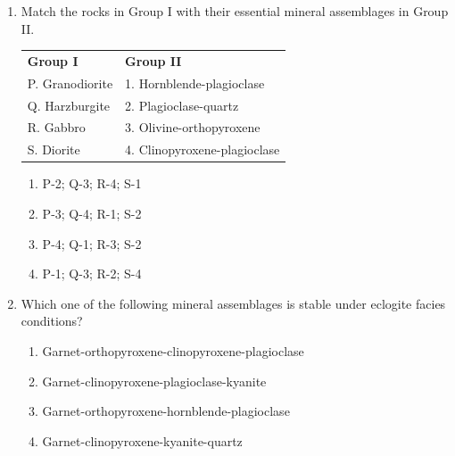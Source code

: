 \documentclass[journal,12pt,onecolumn]{IEEEtran}
\begin{document}
\begin{enumerate}
\begin{enumerate}
\hfill{}

\begin{multicols}{2}
\begin{enumerate}
\item P-4; Q-2; R-3; S-1
\item P-3; Q-2; R-1; S-4
\item P-3; Q-4; R-1; S-2
\item P-1; Q-3; R-4; S-2
\end{enumerate}
\end{multicols}

\item Match the rocks in Group I with their essential mineral assemblages in Group II.

\begin{tabular}{p{} p{}}
\textbf{Group I} & \textbf{Group II} \\
P. Granodiorite & 1. Hornblende-plagioclase \\
Q. Harzburgite & 2. Plagioclase-quartz \\
R. Gabbro & 3. Olivine-orthopyroxene \\
S. Diorite & 4. Clinopyroxene-plagioclase \\
\end{tabular}

\hfill{}

\begin{multicols}{2}
\begin{enumerate}
\item P-2; Q-3; R-4; S-1
\item P-3; Q-4; R-1; S-2
\item P-4; Q-1; R-3; S-2
\item P-1; Q-3; R-2; S-4
\end{enumerate}
\end{multicols}

\item Which one of the following mineral assemblages is stable under eclogite facies conditions?

\hfill{}


\begin{enumerate}
\item Garnet-orthopyroxene-clinopyroxene-plagioclase
\item Garnet-clinopyroxene-plagioclase-kyanite
\item Garnet-orthopyroxene-hornblende-plagioclase
\item Garnet-clinopyroxene-kyanite-quartz
\end{enumerate}



\end{enumerate}
\end{enumerate}
\end{document}
